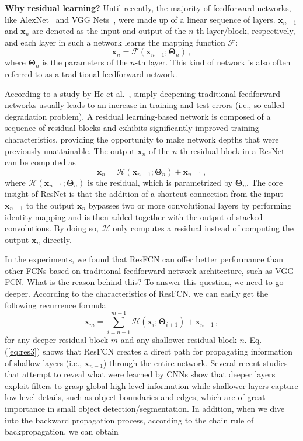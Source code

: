 \documentclass[journal]{IEEEtran}
\begin{document}
\par
\textbf{Why residual learning?} Until recently, the majority of feedforward networks, like AlexNet~\cite{AlexNet} and VGG Nets~\cite{VGGNet}, were made up of a linear sequence of layers. $\bm{x}_{n-1}$ and $\bm{x}_n$ are denoted as the input and output of the $n$-th layer/block, respectively, and each layer in such a network learns the mapping function $\mathcal{F}$:
\begin{equation}\label{eq:res1}
\bm{x}_n=\mathcal{F}(\bm{x}_{n-1};\bm{\Theta}_n)\,,
\end{equation}
where $\bm{\Theta}_n$ is the parameters of the $n$-th layer. This kind of network is also often referred to as a traditional feedforward network.
\par
According to a study by He et al.~\cite{ResNet}, simply deepening traditional feedforward networks usually leads to an increase in training and test errors (i.e., so-called degradation problem). A residual learning-based network is composed of a sequence of residual blocks and exhibits significantly improved training characteristics, providing the opportunity to make network depths that were previously unattainable.
The output $\bm{x}_n$ of the $n$-th residual block in a ResNet can be computed as
\begin{equation}\label{eq:res2}
\bm{x}_n=\mathcal{H}(\bm{x}_{n-1};\bm{\Theta}_n)+\bm{x}_{n-1}\,,
\end{equation}
where $\mathcal{H}(\bm{x}_{n-1};\bm{\Theta}_n)$ is the residual, which is parametrized by $\bm{\Theta}_n$. The core insight of ResNet is that the addition of a shortcut connection from the input $\bm{x}_{n-1}$ to the output $\bm{x}_n$ bypasses two or more convolutional layers by performing identity mapping and is then added together with the output of stacked convolutions. By doing so, $\mathcal{H}$ only computes a residual instead of computing the output $\bm{x}_n$ directly.
\par
In the experiments, we found that ResFCN can offer better performance than other FCNs based on traditional feedforward network architecture, such as VGG-FCN. What is the reason behind this? To answer this question, we need to go deeper. According to the characteristics of ResFCN, we can easily get the following recurrence formula
\begin{equation}\label{eq:res3}
\bm{x}_m=\sum_{i=n-1}^{m-1}\mathcal{H}(\bm{x}_{i};\bm{\Theta}_{i+1})+\bm{x}_{n-1}\,,
\end{equation}
for any deeper residual block $m$ and any shallower residual block $n$. Eq. (\ref{eq:res3}) shows that ResFCN creates a direct path for propagating information of shallow layers (i.e., $\bm{x}_{n-1}$) through the entire network. Several recent studies~\cite{Zeiler14,Mahendran15} that attempt to reveal what were learned by CNNs show that deeper layers exploit filters to grasp global high-level information while shallower layers capture low-level details, such as object boundaries and edges, which are of great importance in small object detection/segmentation. In addition, when we dive into the backward propagation process, according to the chain rule of backpropagation, we can obtain
\end{document}
